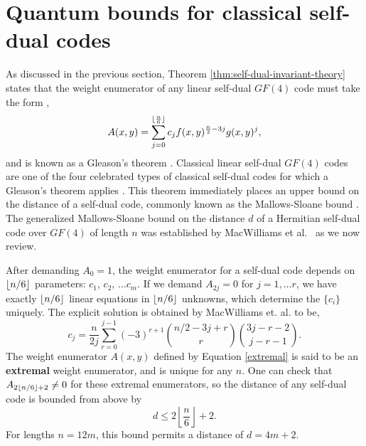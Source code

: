\documentclass[11pt]{article}
\DeclarePairedDelimiter\floor{\lfloor}{\rfloor}
\begin{document}
\section{Quantum bounds for classical self-dual codes}
\label{sec:self-dual}

As discussed in the previous section, Theorem \ref{thm:self-dual-invariant-theory} states that the weight enumerator of any linear self-dual  $GF(4)$ code must take the form \cite{macwilliams1978self, nebe2006self},
\begin{equation}
    A(x,y) = \sum_{j=0}^{\floor{\frac{n}{6}}} c_j {f}(x,y)^{\frac{n}{2}-3j} g(x,y)^j, \label{invariant-theory-self-dual}
\end{equation}
and is known as a Gleason's theorem \cite{gleason1971weight, macwilliams1972generalizations}. Classical linear self-dual $GF(4)$ codes are one of the four celebrated types of classical self-dual codes for which a Gleason's theorem applies \cite{rains2002self}. This theorem immediately places an upper bound on the distance of a self-dual code, commonly known as the Mallows-Sloane bound \cite{MALLOWS1973188}. The generalized Mallows-Sloane bound on the distance $d$ of a Hermitian self-dual code over $GF(4)$ of length $n$ was established by MacWilliams et al.~\cite{macwilliams1978self} as we now review.

After demanding $A_0=1$, the weight enumerator for a self-dual code depends on $\floor{n/6}$ parameters: $c_1$, $c_2$, $\ldots c_{m}$. If we demand $A_{2j}=0$ for $j=1,\ldots r$, we have exactly $\floor{n/6}$ linear equations in $\floor{n/6}$ unknowns, which determine the $\{c_i\}$ uniquely. The explicit solution is obtained by MacWilliams et. al.  \cite{macwilliams1978self} to be,
\begin{equation}
    c_j = \frac{n}{2j} \sum_{r=0}^{j-1} (-3)^{r+1} \binom{n/2-3j+r}{r} \binom{3j-r-2}{j-r-1}. \label{extremal}
\end{equation}
The weight enumerator $A(x,y)$ defined by Equation \eqref{extremal} is said to be an \textbf{extremal} weight enumerator, and is unique for any $n$. One can check that $A_{2\floor{n/6}+2} \neq 0$ for these extremal enumerators, so the distance of any self-dual code is bounded from above by 
\begin{equation}
    d \leq 2 \left\lfloor \frac{n}{6} \right\rfloor + 2.
    \label{eq:mallows-sloane}
\end{equation}
For lengths $n=12m$, this bound permits a distance of $d = 4m+2$.
\end{document}
